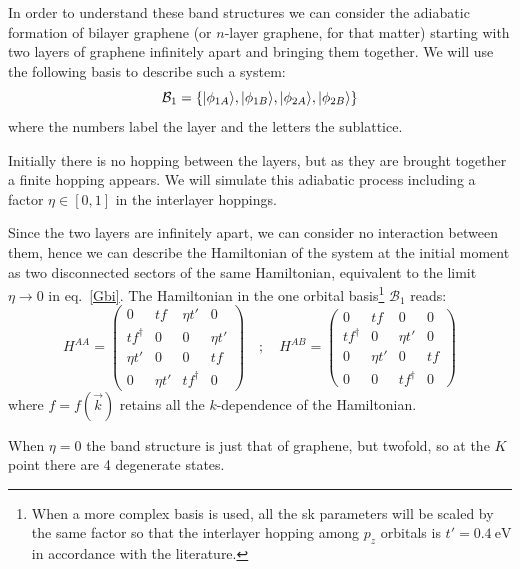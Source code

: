 In order to understand these band structures we can consider the adiabatic formation of bilayer graphene (or $n$-layer graphene, for that matter) starting with two layers of graphene infinitely apart and bringing them together.
We will use the following basis to describe such a system:
\begin{equation}
  \mathcal{B}_1 = \left\{|\phi_{1A}\rangle, |\phi_{1B}\rangle,
                        |\phi_{2A}\rangle, |\phi_{2B}\rangle\right\}
\label{basis_bi}
\end{equation}
where the numbers label the layer and the letters the sublattice.
\bigskip

Initially there is no hopping between the layers, but as they are brought together a finite hopping appears. We will simulate this adiabatic process including a factor $\eta\in[0,1]$ in the interlayer hoppings.


Since the two layers are infinitely apart, we can consider no interaction between them, hence we can describe the Hamiltonian of the system at the initial moment as two disconnected sectors of the same Hamiltonian, equivalent to the limit $\eta\rightarrow0$ in eq.~\eqref{Gbi}. The Hamiltonian in the one orbital basis\footnote{When a more complex basis is used, all the \ac{sk} parameters will be scaled by the same factor so that the interlayer hopping among $p_z$ orbitals is $t'=\SI{0.4}{\eV}$ in accordance with the literature\cite{KatsnelsonBook}.} $\mathcal{B}_1$ reads:
\begin{equation}
   H^{AA} = \left(\begin{array}{cc|cc}
     0 & tf & \eta t' & 0 \\
     tf^{\dagger} & 0 & 0 & \eta t' \\ \hline
     \eta t' & 0 & 0 & tf \\
     0 & \eta t' & tf^{\dagger} & 0
  \end{array}\right) \quad;\quad
   H^{AB} = \left(\begin{array}{c|cc|c}
     0 & tf & 0 & 0 \\ \hline
     tf^{\dagger} & 0 & \eta t' & 0 \\
     0 & \eta t' & 0 & tf \\ \hline
     0 & 0 & tf^{\dagger} & 0
  \end{array}\right)
\label{Gbi}
\end{equation}
where $f = f(\vec{k})$ retains all the $k$-dependence of the Hamiltonian.
\smallskip

When $\eta=0$ the band structure is just that of graphene, but twofold, so at the $K$ point there are 4 degenerate states.

